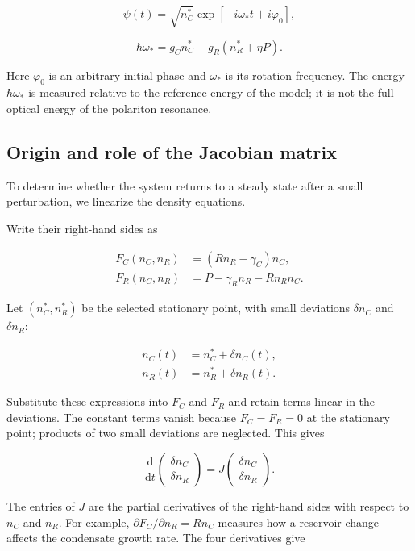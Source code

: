 \documentclass[12pt,a4paper]{article}
\begin{document}
\[
\psi(t)=\sqrt{n_C^*}\exp[-i\omega_*t+i\varphi_0],
\]

\begin{equation}\label{eq:11}\hbar\omega_*=g_Cn_C^*+g_R(n_R^*+\eta P).\end{equation}

Here $\varphi_{0}$ is an arbitrary initial phase and $\omega_{*}$ is its rotation frequency. The energy $\hbar \omega_{*}$ is measured relative to the reference energy of the model; it is not the full optical energy of the polariton resonance.

\subsection{Origin and role of the Jacobian matrix}\label{sec:3.3}

To determine whether the system returns to a steady state after a small perturbation, we linearize the density equations.

Write their right-hand sides as

\[
\begin{aligned}F_C(n_C,n_R)&=(Rn_R-\gamma_C)n_C,\\F_R(n_C,n_R)&=P-\gamma_R n_R-Rn_Rn_C.\end{aligned}
\]

Let $(n_{C}^{*},n_{R}^{*})$ be the selected stationary point, with small deviations $\delta n_{C}$ and $\delta n_{R}$:

\[
\begin{aligned}n_C(t)&=n_C^*+\delta n_C(t),\\n_R(t)&=n_R^*+\delta n_R(t).\end{aligned}
\]

Substitute these expressions into $F_{C}$ and $F_{R}$ and retain terms linear in the deviations. The constant terms vanish because $F_{C}=F_{R}=0$ at the stationary point; products of two small deviations are neglected. This gives

\[
\frac{\mathrm d}{\mathrm dt}\begin{pmatrix}\delta n_C\\\delta n_R\end{pmatrix}=J\begin{pmatrix}\delta n_C\\\delta n_R\end{pmatrix}.
\]

The entries of $J$ are the partial derivatives of the right-hand sides with respect to $n_{C}$ and $n_{R}$. For example, $\partial F_{C}/\partial n_{R}=R n_{C}$ measures how a reservoir change affects the condensate growth rate. The four derivatives give
\end{document}
